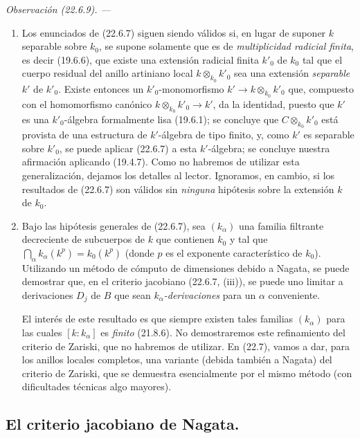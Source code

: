 \documentclass[10pt,oneside]{book}
\makeatletter
\newcommand{\setmanualcurrentlabel}[1]{\def\@currentlabel{#1}}
\newcommand{\oldpage}[2][]{%
  \setcounter{footnote}{0}%
  \marginpar{\scriptsize\textbf{#1}~|~#2}\ignorespaces}
\newenvironment{remark}[1][]{%
  \setmanualcurrentlabel{#1}\par\medskip\noindent\itshape Observación (#1). ---\ }{\par}
\makeatother
\begin{document}
\begin{remark}[22.6.9]
\label{0.22.6.9-es}
\begin{enumerate}
  \item[\rm(i)] Los enunciados de (22.6.7) siguen siendo válidos si, en lugar de
  suponer $k$ separable sobre $k_0$, se supone solamente que es de
  \emph{multiplicidad radicial finita}, es decir (19.6.6), que existe
  una extensión radicial finita $k'_0$ de $k_0$ tal que el cuerpo residual del
  anillo artiniano local $k\otimes_{k_0}k'_0$ sea una extensión \emph{separable}
  $k'$ de $k'_0$. Existe entonces un $k'_0$-monomorfismo
  $k'\longrightarrow k\otimes_{k_0}k'_0$ que, compuesto con el homomorfismo
  canónico $k\otimes_{k_0}k'_0\longrightarrow k'$, da la identidad, puesto que
  $k'$ es una $k'_0$-álgebra formalmente lisa (19.6.1); se concluye que
  $C\otimes_{k_0}k'_0$ está provista de una estructura de $k'$-álgebra de tipo finito,
  y, como $k'$ es separable sobre $k'_0$, se puede aplicar (22.6.7) a esta
  $k'$-álgebra; se concluye nuestra afirmación aplicando (19.4.7). Como
  no habremos de utilizar esta generalización, dejamos los detalles al
  lector. Ignoramos, en cambio, si los resultados de (22.6.7) son válidos sin
  \emph{ninguna} hipótesis sobre la extensión $k$ de $k_0$.
  \item[\rm(ii)] Bajo las hipótesis generales de (22.6.7), sea $(k_\alpha)$
  una familia filtrante decreciente de subcuerpos de $k$ que contienen $k_0$ y
  tal que
  $\bigcap_\alpha k_\alpha(k^p)=k_0(k^p)$ (donde $p$ es el exponente
  característico de $k_0$). Utilizando un método de cómputo de dimensiones
  debido a Nagata, se puede demostrar que, en el criterio jacobiano (22.6.7, (iii)),
  se puede uno limitar a derivaciones $D_j$ de $B$ que sean
  \emph{$k_\alpha$-derivaciones} para un $\alpha$ conveniente.

  \oldpage[0\textsubscript{IV-1}]{209}

  El interés de este resultado es que siempre existen tales familias
  $(k_\alpha)$ para las cuales $[k:k_\alpha]$ es \emph{finito} (21.8.6). No
  demostraremos este refinamiento del criterio de Zariski, que no habremos de
  utilizar. En (22.7), vamos a dar, para los anillos locales completos,
  una variante (debida también a Nagata) del criterio de Zariski, que se demuestra
  esencialmente por el mismo método (con dificultades técnicas algo
  mayores).
\end{enumerate}
\end{remark}

\subsection{El criterio jacobiano de Nagata.}
\label{subsection:0.22.7-es}
\end{document}
